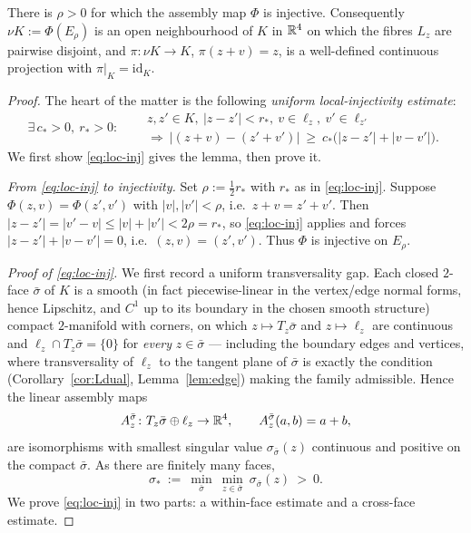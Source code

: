 \begin{qeightlemma}\label{lem:disjoint}
There is $\rho>0$ for which the assembly map $\Phi$ is injective. Consequently
$\nu K:=\Phi(E_\rho)$ is an open neighbourhood of $K$ in $\mathbb{R}^4$ on which the
fibres $L_z$ are pairwise disjoint, and $\pi\colon\nu K\to K$, $\pi(z+v)=z$, is a
well-defined continuous projection with $\pi|_K=\mathrm{id}_K$.
\end{qeightlemma}

\begin{proof}
The heart of the matter is the following \emph{uniform local-injectivity estimate}:
\begin{equation}\label{eq:loc-inj}
\exists\,c_\ast>0,\ r_\ast>0:\quad
\begin{aligned}
&z,z'\in K,\ |z-z'|<r_\ast,\ v\in\ell_z,\ v'\in\ell_{z'}\\
&\Longrightarrow\
|(z+v)-(z'+v')|\ \ge\ c_\ast\bigl(|z-z'|+|v-v'|\bigr).
\end{aligned}
\end{equation}
We first show \eqref{eq:loc-inj} gives the lemma, then prove it.

\emph{From \eqref{eq:loc-inj} to injectivity.} Set $\rho:=\tfrac12 r_\ast$ with
$r_\ast$ as in \eqref{eq:loc-inj}. Suppose $\Phi(z,v)=\Phi(z',v')$ with $|v|,|v'|<\rho$,
i.e.\ $z+v=z'+v'$. Then $|z-z'|=|v'-v|\le|v|+|v'|<2\rho=r_\ast$, so \eqref{eq:loc-inj}
applies and forces $|z-z'|+|v-v'|=0$, i.e.\ $(z,v)=(z',v')$. Thus $\Phi$ is injective
on $E_\rho$.

\emph{Proof of \eqref{eq:loc-inj}.} We first record a uniform transversality gap.
Each closed $2$-face $\bar\sigma$ of $K$ is a smooth (in fact piecewise-linear in the
vertex/edge normal forms, hence Lipschitz, and $C^1$ up to its boundary in the chosen
smooth structure) compact $2$-manifold with corners, on which $z\mapsto T_z\bar\sigma$
and $z\mapsto\ell_z$ are continuous and $\ell_z\cap T_z\bar\sigma=\{0\}$ for
\emph{every} $z\in\bar\sigma$ --- including the boundary edges and vertices, where
transversality of $\ell_z$ to the tangent plane of $\bar\sigma$ is exactly the
condition (Corollary~\ref{cor:Ldual}, Lemma~\ref{lem:edge}) making the family
admissible. Hence the linear assembly maps
\[
A^{\bar\sigma}_z\colon T_z\bar\sigma\oplus\ell_z\to\mathbb{R}^4,\qquad A^{\bar\sigma}_z(a,b)=a+b,
\]
are isomorphisms with smallest singular value $\sigma_{\bar\sigma}(z)$ continuous and
positive on the compact $\bar\sigma$. As there are finitely many faces,
\[
\sigma_\ast\ :=\ \min_{\bar\sigma}\ \min_{z\in\bar\sigma}\ \sigma_{\bar\sigma}(z)\ >\ 0 .
\]
We prove \eqref{eq:loc-inj} in two parts: a within-face estimate and a cross-face
estimate.


\end{proof}
